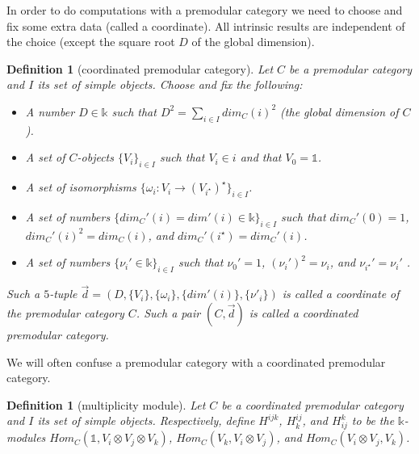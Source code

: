 \documentclass[12pt]{extarticle}
\numberwithin{equation}{section} %
\theoremstyle{mystyle}
\newtheorem{definition}[equation]{Definition}
\begin{document}
\noindent In order to do computations with a premodular category
we need to choose and fix some extra data (called a coordinate).
All intrinsic results are independent of the choice (except the
square root $D$ of the global dimension).

\begin{definition}[coordinated premodular
  category]\label{def/coordinated-premodular-category}
  Let $C$ be a premodular category and $I$ its set of simple objects.
  Choose and fix the following:
  \begin{itemize}
    \item A number $D \in \mathbb{k}$ such that
          $D^{2} = \sum_{i \in I} dim_{C}(i)^{2}$ (the global
          dimension of $C$).
    \item A set of $C$-objects $\{V_{i}\}_{i \in I}$ such
          that $V_{i} \in i$ and that $V_{0} = \mathbb{1}$.
    \item A set of isomorphisms
          \cite[p.313]{turaev-qiok-3-manifolds}
          $\{\omega_{i}: V_{i} \to (V_{i^{\star}})^{\star}\}_{i \in I}$.
    \item A set of numbers
          $\{dim_{C}'(i) = dim'(i) \in \mathbb{k}\}_{i \in I}$
          such that $dim_{C}'(0) = 1$,
          $dim_{C}'(i)^{2} = dim_{C}(i)$, and
          $dim_{C}'(i^{\star}) = dim_{C}'(i)$.
    \item A set of numbers
          $\{\nu_{i}' \in \mathbb{k}\}_{i \in I}$ such that
          $\nu_{0}' = 1$, $(\nu_{i}')^{2} = \nu_{i}$, and
          $\nu_{i^{\star}}' = \nu_{i}'$
          \cite[p.313]{turaev-qiok-3-manifolds}.
  \end{itemize}

  Such a $5$-tuple
  $\vec{d} = (D, \{V_{i}\}, \{\omega_{i}\}, \{dim'(i)\}, \{\nu'_{i}\})$
  is called a coordinate of the premodular category $C$. Such a
  pair $(C, \vec{d})$ is called a coordinated premodular
  category.
\end{definition}

\noindent We will often confuse a premodular category with a
coordinated premodular category.

\begin{definition}[multiplicity module]\label{def/multiplicity-module}
  Let $C$ be a coordinated premodular category and $I$ its set
  of simple objects. Respectively, define $H^{ijk}$, $H_{k}^{ij}$, and
  $H_{ij}^{k}$ to be the $\mathbb{k}$-modules
  $Hom_{C}(\mathbb{1}, V_{i} \otimes V_{j} \otimes V_{k})$,
  $Hom_{C}(V_{k}, V_{i} \otimes V_{j})$, and
  $Hom_{C}(V_{i} \otimes V_{j}, V_{k})$.
\end{definition}
\end{document}
